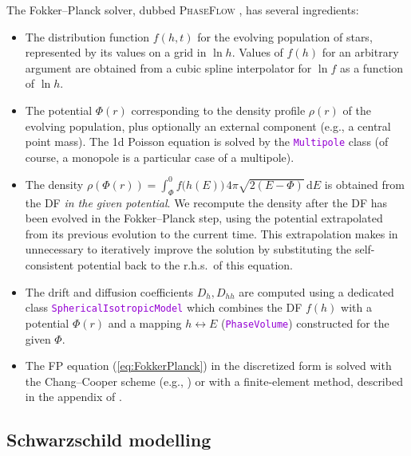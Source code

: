 \documentclass[12pt]{article}
\newcommand{\ttt}[1]{\textcolor{darkviolet}{\texttt{#1}}}
\renewcommand{\d}{\mathrm{d}}
\begin{document}
The Fokker--Planck solver, dubbed \textsc{PhaseFlow} \cite{Vasiliev2017}, has several ingredients:
\begin{itemize}
\item The distribution function $f(h,t)$ for the evolving population of stars, represented by its values on a grid in $\ln h$. Values of $f(h)$ for an arbitrary argument are obtained from a cubic spline interpolator for $\ln f$ as a function of $\ln h$.
\item The potential $\Phi(r)$ corresponding to the density profile $\rho(r)$ of the evolving population, plus optionally an external component (e.g., a central point mass). The 1d Poisson equation is solved by the \ttt{Multipole} class (of course, a monopole is a particular case of a multipole).
\item The density $\rho(\Phi(r)) = \int_{\Phi}^0 f\big(h(E)\big)\,4\pi\sqrt{2(E-\Phi)}\,\d E$ is obtained from the DF \textit{in the given potential}. We recompute the density after the DF has been evolved in the Fokker--Planck step, using the potential extrapolated from its previous evolution to the current time. This extrapolation makes in unnecessary to iteratively improve the solution by substituting the self-consistent potential back to the r.h.s.\ of this equation.
\item The drift and diffusion coefficients $D_h, D_{hh}$ are computed using a dedicated class \ttt{SphericalIsotropicModel} which combines the DF $f(h)$ with a potential $\Phi(r)$ and a mapping $h\leftrightarrow E$ (\ttt{PhaseVolume}) constructed for the given $\Phi$.
\item The FP equation (\ref{eq:FokkerPlanck}) in the discretized form is solved with the Chang--Cooper scheme (e.g., \cite{ParkPetrosian1996}) or with a finite-element method, described in the appendix of \cite{Vasiliev2017}.
\end{itemize}


\subsection{Schwarzschild modelling}  \label{sec:SchwarzschildDetails}
\end{document}
